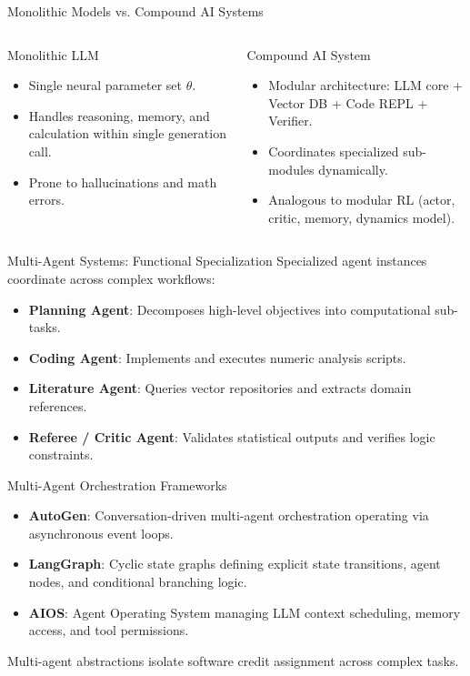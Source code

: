\documentclass[10pt, aspectratio=169]{beamer}
\begin{document}
\begin{frame}{Monolithic Models vs. Compound AI Systems}
  \begin{columns}
    \begin{block}{Monolithic LLM}
      \begin{itemize}
        \item Single neural parameter set $\theta$.
        \item Handles reasoning, memory, and calculation within single generation call.
        \item Prone to hallucinations and math errors.
      \end{itemize}
    \end{block}

    \begin{block}{Compound AI System}
      \begin{itemize}
        \item Modular architecture: LLM core + Vector DB + Code REPL + Verifier.
        \item Coordinates specialized sub-modules dynamically.
        \item Analogous to modular RL (actor, critic, memory, dynamics model).
      \end{itemize}
    \end{block}
  \end{columns}
\end{frame}

\begin{frame}{Multi-Agent Systems: Functional Specialization}
  Specialized agent instances coordinate across complex workflows:
  \begin{itemize}
    \item \textbf{Planning Agent}: Decomposes high-level objectives into computational sub-tasks.
    \item \textbf{Coding Agent}: Implements and executes numeric analysis scripts.
    \item \textbf{Literature Agent}: Queries vector repositories and extracts domain references.
    \item \textbf{Referee / Critic Agent}: Validates statistical outputs and verifies logic constraints.
  \end{itemize}
\end{frame}

\begin{frame}{Multi-Agent Orchestration Frameworks}
  \begin{itemize}
    \item \textbf{AutoGen}: Conversation-driven multi-agent orchestration operating via asynchronous event loops.
    \item \textbf{LangGraph}: Cyclic state graphs defining explicit state transitions, agent nodes, and conditional branching logic.
    \item \textbf{AIOS}: Agent Operating System managing LLM context scheduling, memory access, and tool permissions.
  \end{itemize}
  Multi-agent abstractions isolate software credit assignment across complex tasks.
\end{frame}
\end{document}
